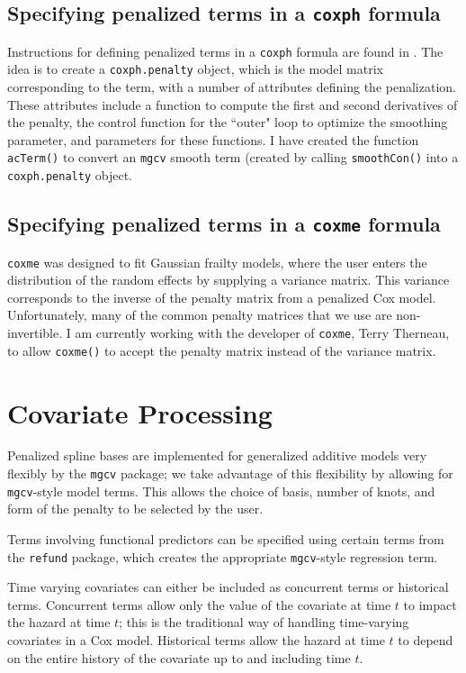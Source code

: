 \documentclass[12pt]{article}
\begin{document}
\subsection{Specifying penalized terms in a \texttt{coxph} formula}

Instructions for defining penalized terms in a \texttt{coxph} formula are found in \citet{Grambsch1998}. The idea
is to create a \texttt{coxph.penalty} object, which is the model matrix corresponding to the term, with a number
of attributes defining the penalization. These attributes include a function to compute the first and second derivatives
of the penalty, the control function for the ``outer" loop to optimize the smoothing parameter, and parameters for these
functions. I have created the function \texttt{acTerm()} to convert an \texttt{mgcv} smooth term (created by calling
\texttt{smoothCon()} into a \texttt{coxph.penalty} object.

\subsection{Specifying penalized terms in a \texttt{coxme} formula}

\texttt{coxme} was designed to fit Gaussian frailty models, where the user enters the distribution of the random effects
by supplying a variance matrix. This variance corresponds to the inverse of the penalty matrix from a penalized
Cox model. Unfortunately, many of the common penalty matrices that we use are non-invertible. I am currently working
with the developer of \texttt{coxme}, Terry Therneau, to allow \texttt{coxme()} to accept the penalty matrix instead
of the variance matrix.


\section{Covariate Processing} \label{sec:covariate}

Penalized spline bases are implemented for generalized additive models very flexibly by the \texttt{mgcv} package; we
take advantage of this flexibility by allowing for \texttt{mgcv}-style model terms. This allows the choice of basis,
number of knots, and form of the penalty to be selected by the user.

Terms involving functional predictors can
be specified using certain terms from the \texttt{refund} package, which creates the appropriate \texttt{mgcv}-style
regression term.

Time varying covariates
can either be included as concurrent terms or historical terms. Concurrent terms allow only the value of the covariate
at time $t$ to impact the hazard at time $t$; this is the traditional way of handling time-varying covariates in a Cox
model. Historical terms allow the hazard at time $t$ to depend on the entire history of the covariate up to and including
time $t$.
\end{document}
